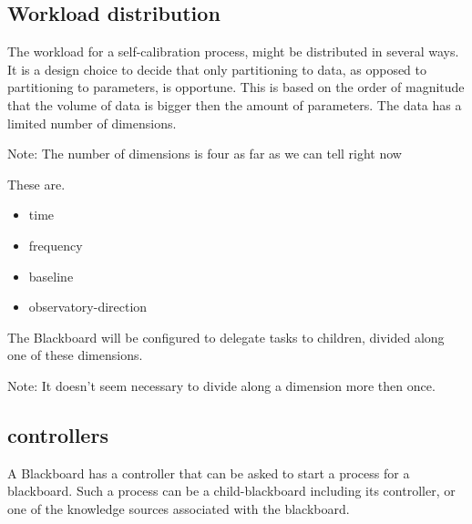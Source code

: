 \documentclass[]{lofar}
\begin{document}
    \subsection{Workload distribution}
    \label{subsec:workload-distribution}\hypertarget{subsec:workload-distribution}{}%

      The workload for a self-calibration process, might be
      distributed in several ways. It is a design choice to decide
      that only partitioning to data, as opposed to partitioning to
      parameters, is opportune. This is based on the order of
      magnitude that the volume of data is bigger then the amount of
      parameters. The data has a limited number of dimensions.
      \begin{em}\large{Note: }
        The number of dimensions is four as far as
        we can tell right now
      \end{em}

      These are.

      \begin{itemize}

        \item 

          time

	\item 

          frequency

	\item 

          baseline

	\item 

          observatory-direction

      \end{itemize}

      The Blackboard will be configured to delegate tasks to children,
      divided along one of these dimensions.
      \begin{em}\large{Note: }
        It doesn't seem
        necessary to divide along a dimension more then once.
      \end{em}

    \subsection{controllers}
    \label{subsec:controllers}\hypertarget{subsec:controllers}{}%

      A Blackboard has a controller that can be asked to start a
      process for a blackboard. Such a process can be a
      child-blackboard including its controller, or one of the
      knowledge sources associated with the blackboard.
\end{document}
